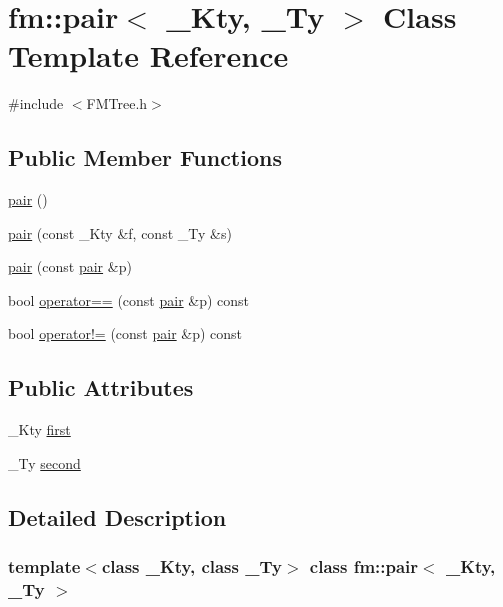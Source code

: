 \hypertarget{classfm_1_1pair}{
\section{fm::pair$<$ \_\-Kty, \_\-Ty $>$ Class Template Reference}
\label{classfm_1_1pair}
}


{\ttfamily \#include $<$FMTree.h$>$}

\subsection*{Public Member Functions}
\begin{DoxyCompactItemize}
\item 
\hyperlink{classfm_1_1pair_a523cfcc6a881d0e7bd2523ff29cdae5c}{pair} ()
\item 
\hyperlink{classfm_1_1pair_a93060222846a0ded493455668885d186}{pair} (const \_\-Kty \&f, const \_\-Ty \&s)
\item 
\hyperlink{classfm_1_1pair_ab8ee957c64f6475c9e60d06f1d3e885f}{pair} (const \hyperlink{classfm_1_1pair}{pair} \&p)
\item 
bool \hyperlink{classfm_1_1pair_af531c9d7ff82ca65b5e69cafaaaae6cd}{operator==} (const \hyperlink{classfm_1_1pair}{pair} \&p) const 
\item 
bool \hyperlink{classfm_1_1pair_af965c8761cb9303f4830c538dfdab3a0}{operator!=} (const \hyperlink{classfm_1_1pair}{pair} \&p) const 
\end{DoxyCompactItemize}
\subsection*{Public Attributes}
\begin{DoxyCompactItemize}
\item 
\_\-Kty \hyperlink{classfm_1_1pair_afc22e37d084f7a4e731a297b72b3efd7}{first}
\item 
\_\-Ty \hyperlink{classfm_1_1pair_a80c0b96ba80f34765fd06b0899506977}{second}
\end{DoxyCompactItemize}


\subsection{Detailed Description}
\subsubsection*{template$<$class \_\-Kty, class \_\-Ty$>$ class fm::pair$<$ \_\-Kty, \_\-Ty $>$}

